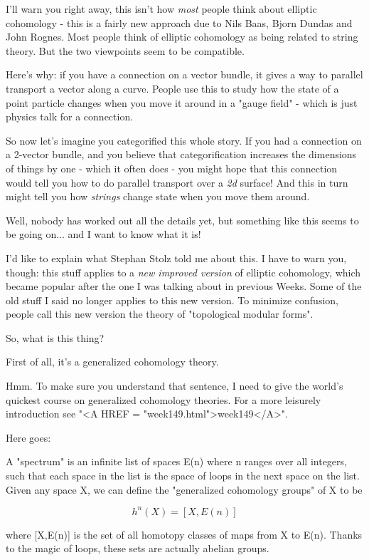 I'll warn you right away, this isn't how \emph{most} people think 
about elliptic cohomology - this is a fairly new approach due to 
Nils Baas, Bjorn Dundas and John Rognes.  Most people think of 
elliptic cohomology as being related to string theory.  But the 
two viewpoints seem to be compatible.

Here's why: if you have a connection on a vector bundle, it gives 
a way to parallel transport a vector along a curve.  People use this 
to study how the state of a point particle changes when you move it 
around in a "gauge field" - which is just physics talk for 
a connection.

So now let's imagine you categorified this whole story.  If you 
had a connection on a 2-vector bundle, and you believe that 
categorification increases the dimensions of things by one -
which it often does - you might hope that this connection would 
tell you how to do parallel transport over a \emph{2d} surface!  And 
this in turn might tell you how \emph{strings} change state when you 
move them around.

Well, nobody has worked out all the details yet, but something like
this seems to be going on... and I want to know what it is!

I'd like to explain what Stephan Stolz told me about this.  I have 
to warn you, though: this stuff applies to a \emph{new improved version}
of elliptic cohomology, which became popular after the one I was 
talking about in previous Weeks.  
Some of the old stuff I said no longer applies to 
this new version.  To minimize confusion, people call this new 
version the theory of "topological modular forms".   

So, what is this thing?

First of all, it's a generalized cohomology theory.  

Hmm.  To make sure you understand that sentence, I need to give
the world's quickest course on generalized cohomology theories.  
For a more leisurely introduction see 
"<A HREF = "week149.html">week149</A>".

Here goes: 

A "spectrum" is an infinite list of spaces E(n) where n ranges over 
all integers, such that each space in the list is the space of 
loops in the next space on the list.  Given any space X, we can 
define the "generalized cohomology groups" of X to be 

$$
h^{n}(X) = [X,E(n)]
$$
    
where [X,E(n)] is the set of all homotopy classes of maps from
X to E(n).  Thanks to the magic of loops, these sets are actually
abelian groups.  

